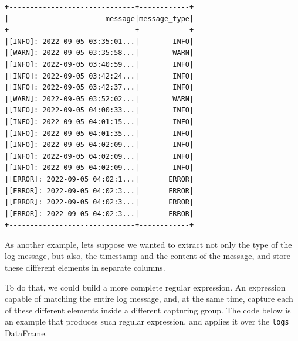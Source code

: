 \documentclass[
  11pt,
  letterpaper,
  DIV=11,
  numbers=noendperiod]{scrreprt}
\begin{document}
\begin{verbatim}
+------------------------------+------------+
|                       message|message_type|
+------------------------------+------------+
|[INFO]: 2022-09-05 03:35:01...|        INFO|
|[WARN]: 2022-09-05 03:35:58...|        WARN|
|[INFO]: 2022-09-05 03:40:59...|        INFO|
|[INFO]: 2022-09-05 03:42:24...|        INFO|
|[INFO]: 2022-09-05 03:42:37...|        INFO|
|[WARN]: 2022-09-05 03:52:02...|        WARN|
|[INFO]: 2022-09-05 04:00:33...|        INFO|
|[INFO]: 2022-09-05 04:01:15...|        INFO|
|[INFO]: 2022-09-05 04:01:35...|        INFO|
|[INFO]: 2022-09-05 04:02:09...|        INFO|
|[INFO]: 2022-09-05 04:02:09...|        INFO|
|[INFO]: 2022-09-05 04:02:09...|        INFO|
|[ERROR]: 2022-09-05 04:02:1...|       ERROR|
|[ERROR]: 2022-09-05 04:02:3...|       ERROR|
|[ERROR]: 2022-09-05 04:02:3...|       ERROR|
|[ERROR]: 2022-09-05 04:02:3...|       ERROR|
+------------------------------+------------+
\end{verbatim}

As another example, lets suppose we wanted to extract not only the type
of the log message, but also, the timestamp and the content of the
message, and store these different elements in separate columns.

To do that, we could build a more complete regular expression. An
expression capable of matching the entire log message, and, at the same
time, capture each of these different elements inside a different
capturing group. The code below is an example that produces such regular
expression, and applies it over the \texttt{logs} DataFrame.
\end{document}

